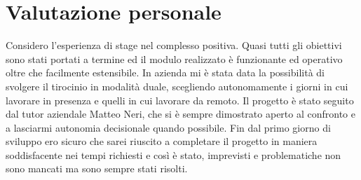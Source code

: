 \section{Valutazione personale}

Considero l'esperienza di stage nel complesso positiva. Quasi tutti gli obiettivi sono stati portati a termine ed il modulo realizzato è funzionante ed operativo oltre che facilmente estensibile. In azienda mi è stata data la possibilità di svolgere il tirocinio in modalità duale, scegliendo autonomamente i giorni in cui lavorare in presenza e quelli in cui lavorare da remoto. Il progetto è stato seguito dal tutor aziendale Matteo Neri, che si è sempre dimostrato aperto al confronto e a lasciarmi autonomia decisionale quando possibile. \newline{}
Fin dal primo giorno di sviluppo ero sicuro che sarei riuscito a completare il progetto in maniera soddisfacente nei tempi richiesti e così è stato, imprevisti e problematiche non sono mancati ma sono sempre stati risolti.
